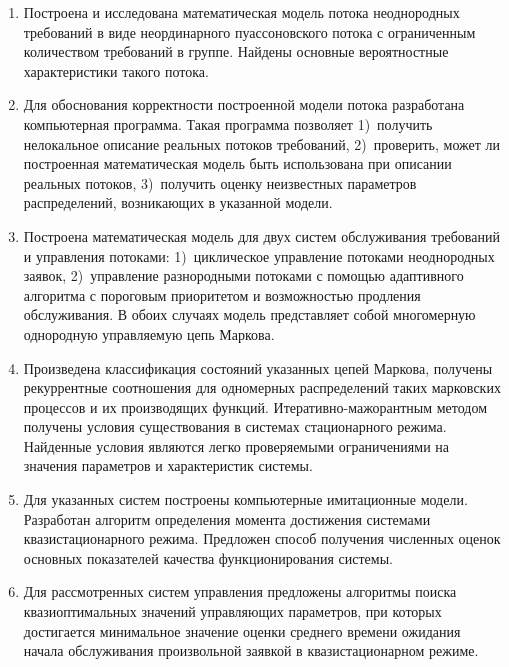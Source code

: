\begin{enumerate}
  \item Построена и исследована математическая модель потока неоднородных требований в виде неординарного пуассоновского потока с ограниченным количеством требований в группе. Найдены основные вероятностные характеристики такого потока. 
  \item Для обоснования корректности построенной модели потока разработана компьютерная программа. Такая программа позволяет 1)~получить нелокальное описание реальных потоков требований, 2)~проверить, может ли построенная математическая модель быть использована при описании реальных потоков, 3)~получить оценку неизвестных параметров распределений, возникающих в указанной модели.
  \item Построена математическая модель для двух систем обслуживания требований и управления потоками: 1)~циклическое управление потоками неоднородных заявок, 2)~управление разнородными потоками с помощью адаптивного алгоритма с пороговым приоритетом и возможностью продления обслуживания. В обоих случаях модель представляет собой многомерную однородную управляемую цепь Маркова. 
  \item Произведена классификация состояний указанных цепей Маркова, получены рекуррентные соотношения для одномерных распределений таких марковских процессов и их производящих функций. Итеративно-мажорантным методом получены условия существования в системах стационарного режима. Найденные условия являются легко проверяемыми ограничениями на значения параметров и характеристик системы. 
  \item Для указанных систем построены компьютерные имитационные модели. Разработан алгоритм определения момента достижения системами квазистационарного режима. Предложен способ получения численных оценок основных показателей качества функционирования системы.
  \item Для рассмотренных систем управления предложены алгоритмы поиска квазиоптимальных значений управляющих параметров, при которых достигается минимальное значение оценки среднего времени ожидания начала обслуживания произвольной заявкой в квазистационарном режиме.
\end{enumerate}
